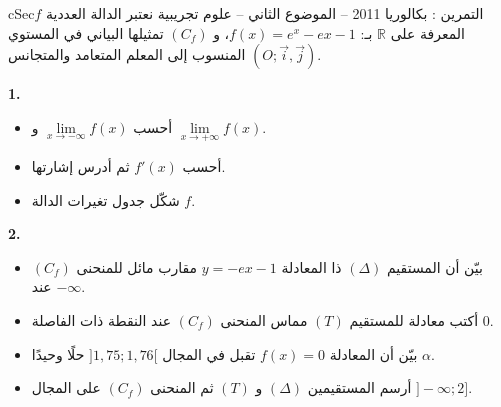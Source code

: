 \documentclass[12pt,a4paper]{article}
\newenvironment{BOX}[2]{\begin{otherlanguage}{english}\begin{arbox}{#1}{#2}}{\end{arbox}\end{otherlanguage}}
\newcounter{exo}
\newenvironment{tamrin}[1]{\stepcounter{exo}\begin{BOX}{cSec}{التمرين \theexo: #1}}{\end{BOX}}
\newcommand{\R}{\mathbb{R}}
\newenvironment{sq}{\begin{itemize}[leftmargin=2.4em,itemsep=3pt]}{\end{itemize}}
\newcommand{\qa}{\item[(أ)]}\newcommand{\qb}{\item[(ب)]}\newcommand{\qc}{\item[(جـ)]}\newcommand{\qd}{\item[(د)]}\newcommand{\qe}{\item[(هـ)]}
\newcommand{\QQ}[1]{\par\smallskip\textbf{#1.} }
\begin{document}
\begin{tamrin}{بكالوريا 2011 -- الموضوع الثاني -- علوم تجريبية}
نعتبر الدالة العددية $f$ المعرفة على $\R$ بـ: $f(x)=e^x-ex-1$، و $(C_f)$ تمثيلها البياني في المستوي المنسوب إلى المعلم المتعامد والمتجانس $(O;\vec i,\vec j)$.

\QQ{1}
\begin{sq}
\qa أحسب $\lim\limits_{x\to-\infty}f(x)$ و $\lim\limits_{x\to+\infty}f(x)$.
\qb أحسب $f'(x)$ ثم أدرس إشارتها.
\qc شكّل جدول تغيرات الدالة $f$.
\end{sq}
\QQ{2}
\begin{sq}
\qa بيّن أن المستقيم $(\Delta)$ ذا المعادلة $y=-ex-1$ مقارب مائل للمنحنى $(C_f)$ عند $-\infty$.
\qb أكتب معادلة للمستقيم $(T)$ مماس المنحنى $(C_f)$ عند النقطة ذات الفاصلة $0$.
\qc بيّن أن المعادلة $f(x)=0$ تقبل في المجال $]1{,}75;1{,}76[$ حلًا وحيدًا $\alpha$.
\qd أرسم المستقيمين $(\Delta)$ و $(T)$ ثم المنحنى $(C_f)$ على المجال $]{-}\infty;2]$.
\end{sq}
\end{tamrin}
\end{document}
